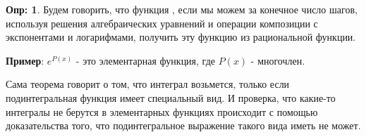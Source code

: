 \documentclass[12pt]{article}
\theoremstyle{definition}
\newtheorem{defn}{Опр:}
\begin{document}
\begin{defn}
	Будем говорить, что функция , если мы можем за конечное число шагов, используя решения алгебраических уравнений и операции композиции с экспонентами и логарифмами, получить эту функцию из рациональной функции.
\end{defn}
\textbf{Пример}: $e^{P(x)}$ - это элементарная функция, где $P(x)$ - многочлен.

Сама теорема говорит о том, что интеграл возьмется, только если подинтегральная функция имеет специальный вид. И проверка, что какие-то интегралы не берутся в элементарных функциях происходит с помощью доказательства того, что подинтегральное выражение такого вида иметь не может.
\end{document}
